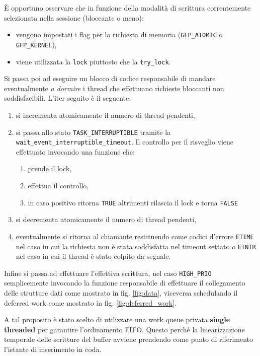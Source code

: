 \documentclass{article}
\begin{document}
È opportuno osservare che in funzione della modalità di scrittura correntemente selezionata nella sessione (bloccante o meno):
\begin{itemize}
        \item vengono impostati i flag per la richiesta di memoria (\texttt{GFP\_ATOMIC} o \texttt{GFP\_KERNEL}),
        \item viene utilizzata la \texttt{lock} piuttosto che la \texttt{try\_lock}.
\end{itemize}

Si passa poi ad eseguire un blocco di codice responsabile di mandare eventualmente \textit{a dormire} i thread che effettuano richieste bloccanti non soddisfacibili. L'iter seguito è il seguente:
\begin{enumerate}
        \item si incrementa atomicamente il numero di thread pendenti,
        \item si passa allo stato \texttt{TASK\_INTERRUPTIBLE} tramite la \texttt{wait\_event\_interruptible\_timeout}. Il controllo per il risveglio viene effettuato invocando una funzione che:\begin{enumerate}
                \item prende il lock,
                \item effettua il controllo,
                \item in caso positivo ritorna \texttt{TRUE} altrimenti rilascia il lock e torna \texttt{FALSE}
        \end{enumerate}
        \item si decrementa atomicamente il numero di thread pendenti,
        \item eventualmente si ritorna al chiamante restituendo come codici d'errore \texttt{ETIME} nel caso in cui la richiesta non è stata soddisfatta nel timeout settato o \texttt{EINTR} nel caso in cui il thread è stato colpito da segnale.
\end{enumerate}

Infine si passa ad effettuare l'effettiva scrittura, nel caso \texttt{HIGH\_PRIO} semplicemente invocando la funzione responsabile di effettuare il collegamento delle strutture dati come mostrato in fig. \ref{fig:data}, viceversa schedulando il deferred work come mostrato in fig. \ref{fig:deferred_work}.

A tal proposito è stato scelto di utilizzare una work queue privata \textbf{single threaded} per garantire l'ordinamento FIFO. Questo perché la linearizzazione temporale delle scritture del buffer avviene prendendo come punto di riferimento l'istante di inserimento in coda.
\end{document}
